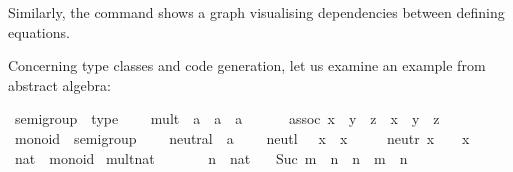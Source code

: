 \begin{isabellebody}
\begin{isamarkuptext}
  Similarly, the \hyperlink{command.code-deps}{\mbox{}} command shows a graph
  visualising dependencies between defining equations.%
\end{isamarkuptext}%
\isamarkuptrue%
%
\isamarkuptrue%
%
\begin{isamarkuptext}%
Concerning type classes and code generation, let us examine an example
  from abstract algebra:%
\end{isamarkuptext}%
\isamarkuptrue%
%
\isadelimquoteme
%
\endisadelimquoteme
%
\isatagquoteme
{}\isamarkupfalse%
\ semigroup\ {\isacharequal}\ type\ {\isacharplus}\isanewline
\ \ \ mult\ {\isacharcolon}{\isacharcolon}\ {\isachardoublequoteopen}{\isacharprime}a\ {\isasymRightarrow}\ {\isacharprime}a\ {\isasymRightarrow}\ {\isacharprime}a{\isachardoublequoteclose}\ {\isacharparenleft}\ {\isachardoublequoteopen}{\isasymotimes}{\isachardoublequoteclose}\ {}{}{\isacharparenright}\isanewline
\ \ \ assoc{\isacharcolon}\ {\isachardoublequoteopen}{\isacharparenleft}x\ {\isasymotimes}\ y{\isacharparenright}\ {\isasymotimes}\ z\ {\isacharequal}\ x\ {\isasymotimes}\ {\isacharparenleft}y\ {\isasymotimes}\ z{\isacharparenright}{\isachardoublequoteclose}\isanewline
\isanewline
{}\isamarkupfalse%
\ monoid\ {\isacharequal}\ semigroup\ {\isacharplus}\isanewline
\ \ \ neutral\ {\isacharcolon}{\isacharcolon}\ {\isacharprime}a\ {\isacharparenleft}{\isachardoublequoteopen}{\isasymone}{\isachardoublequoteclose}{\isacharparenright}\isanewline
\ \ \ neutl{\isacharcolon}\ {\isachardoublequoteopen}{\isasymone}\ {\isasymotimes}\ x\ {\isacharequal}\ x{\isachardoublequoteclose}\isanewline
\ \ \ \ \ neutr{\isacharcolon}\ {\isachardoublequoteopen}x\ {\isasymotimes}\ {\isasymone}\ {\isacharequal}\ x{\isachardoublequoteclose}\isanewline
\isanewline
{}\isamarkupfalse%
\ nat\ {\isacharcolon}{\isacharcolon}\ monoid\isanewline
{}\isanewline
\isanewline
{}\isamarkupfalse%
\ mult{\isacharunderscore}nat\ \isanewline
\ \ \ \ {\isachardoublequoteopen}{}\ {\isasymotimes}\ n\ {\isacharequal}\ {\isacharparenleft}{}{\isasymColon}nat{\isacharparenright}{\isachardoublequoteclose}\isanewline
\ \ {\isacharbar}\ {\isachardoublequoteopen}Suc\ m\ {\isasymotimes}\ n\ {\isacharequal}\ n\ {\isacharplus}\ m\ {\isasymotimes}\ n{\isachardoublequoteclose}\isanewline

\end{isabellebody}
